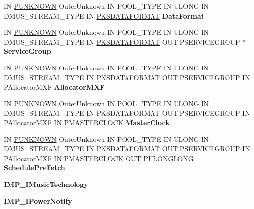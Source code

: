 \begin{DoxyCompactItemize}
IN \hyperlink{interface_i_unknown}{P\+U\+N\+K\+N\+O\+WN} Outer\+Unknown IN P\+O\+O\+L\+\_\+\+T\+Y\+PE IN U\+L\+O\+NG IN D\+M\+U\+S\+\_\+\+S\+T\+R\+E\+A\+M\+\_\+\+T\+Y\+PE IN \hyperlink{struct_k_s_d_a_t_a_f_o_r_m_a_t}{P\+K\+S\+D\+A\+T\+A\+F\+O\+R\+M\+AT} {\bfseries Data\+Format}
\item 
\mbox{\label{class_c_miniport_d_mus_u_a_r_t_a31c04c94cf21e6a8fedfc08299ecab36}} 
IN \hyperlink{interface_i_unknown}{P\+U\+N\+K\+N\+O\+WN} Outer\+Unknown IN P\+O\+O\+L\+\_\+\+T\+Y\+PE IN U\+L\+O\+NG IN D\+M\+U\+S\+\_\+\+S\+T\+R\+E\+A\+M\+\_\+\+T\+Y\+PE IN \hyperlink{struct_k_s_d_a_t_a_f_o_r_m_a_t}{P\+K\+S\+D\+A\+T\+A\+F\+O\+R\+M\+AT} O\+UT P\+S\+E\+R\+V\+I\+C\+E\+G\+R\+O\+UP $\ast$ {\bfseries Service\+Group}
\item 
\mbox{\label{class_c_miniport_d_mus_u_a_r_t_affcfda407bc9d5fbbfd3875e97f51a3e}} 
IN \hyperlink{interface_i_unknown}{P\+U\+N\+K\+N\+O\+WN} Outer\+Unknown IN P\+O\+O\+L\+\_\+\+T\+Y\+PE IN U\+L\+O\+NG IN D\+M\+U\+S\+\_\+\+S\+T\+R\+E\+A\+M\+\_\+\+T\+Y\+PE IN \hyperlink{struct_k_s_d_a_t_a_f_o_r_m_a_t}{P\+K\+S\+D\+A\+T\+A\+F\+O\+R\+M\+AT} O\+UT P\+S\+E\+R\+V\+I\+C\+E\+G\+R\+O\+UP IN P\+Allocator\+M\+XF {\bfseries Allocator\+M\+XF}
\item 
\mbox{\label{class_c_miniport_d_mus_u_a_r_t_a059a6eb1b88a315545e784df8877fe1f}} 
IN \hyperlink{interface_i_unknown}{P\+U\+N\+K\+N\+O\+WN} Outer\+Unknown IN P\+O\+O\+L\+\_\+\+T\+Y\+PE IN U\+L\+O\+NG IN D\+M\+U\+S\+\_\+\+S\+T\+R\+E\+A\+M\+\_\+\+T\+Y\+PE IN \hyperlink{struct_k_s_d_a_t_a_f_o_r_m_a_t}{P\+K\+S\+D\+A\+T\+A\+F\+O\+R\+M\+AT} O\+UT P\+S\+E\+R\+V\+I\+C\+E\+G\+R\+O\+UP IN P\+Allocator\+M\+XF IN P\+M\+A\+S\+T\+E\+R\+C\+L\+O\+CK {\bfseries Master\+Clock}
\item 
\mbox{\label{class_c_miniport_d_mus_u_a_r_t_a2a7deff258032d2aad7f3a4f63dd7210}} 
IN \hyperlink{interface_i_unknown}{P\+U\+N\+K\+N\+O\+WN} Outer\+Unknown IN P\+O\+O\+L\+\_\+\+T\+Y\+PE IN U\+L\+O\+NG IN D\+M\+U\+S\+\_\+\+S\+T\+R\+E\+A\+M\+\_\+\+T\+Y\+PE IN \hyperlink{struct_k_s_d_a_t_a_f_o_r_m_a_t}{P\+K\+S\+D\+A\+T\+A\+F\+O\+R\+M\+AT} O\+UT P\+S\+E\+R\+V\+I\+C\+E\+G\+R\+O\+UP IN P\+Allocator\+M\+XF IN P\+M\+A\+S\+T\+E\+R\+C\+L\+O\+CK O\+UT P\+U\+L\+O\+N\+G\+L\+O\+NG {\bfseries Schedule\+Pre\+Fetch}
\item 
\mbox{\label{class_c_miniport_d_mus_u_a_r_t_ae330708856504e9e099abcdd5c569262}} 
{\bfseries I\+M\+P\+\_\+\+I\+Music\+Technology}
\item 
\mbox{\label{class_c_miniport_d_mus_u_a_r_t_a3123f7463a2eac6486409bf3b03704b0}} 
{\bfseries I\+M\+P\+\_\+\+I\+Power\+Notify}
\end{DoxyCompactItemize}
